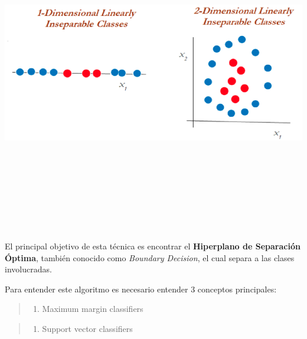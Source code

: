 \documentclass[
]{book}
\providecommand{\tightlist}{%
  \setlength{\itemsep}{0pt}\setlength{\parskip}{0pt}}
\begin{document}
\begin{center}\includegraphics[width=800pt,height=400pt]{img/02-svm/01_inseparable_classes} \end{center}

El principal objetivo de esta técnica es encontrar el \textbf{Hiperplano de Separación Óptima}, también conocido como \emph{Boundary Decision}, el cual separa a las clases involucradas.

Para entender este algoritmo es necesario entender 3 conceptos principales:

\begin{quote}
\begin{enumerate}
\def\labelenumi{\arabic{enumi}.}
\tightlist
\item
  Maximum margin classifiers
\end{enumerate}
\end{quote}

\begin{quote}
\begin{enumerate}
\def\labelenumi{\arabic{enumi}.}
\setcounter{enumi}{1}
\tightlist
\item
  Support vector classifiers
\end{enumerate}
\end{quote}
\end{document}
